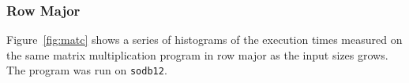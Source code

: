 \documentclass[10pt]{article}
\begin{document}
\clearpage
\pagebreak

\subsubsection{Row Major}

Figure~\ref{fig:matc} shows a series of 
histograms of the execution times measured on 
the same matrix multiplication program in row major as the input sizes grows. 
The program was run on {\tt sodb12}.


%
\end{document}
